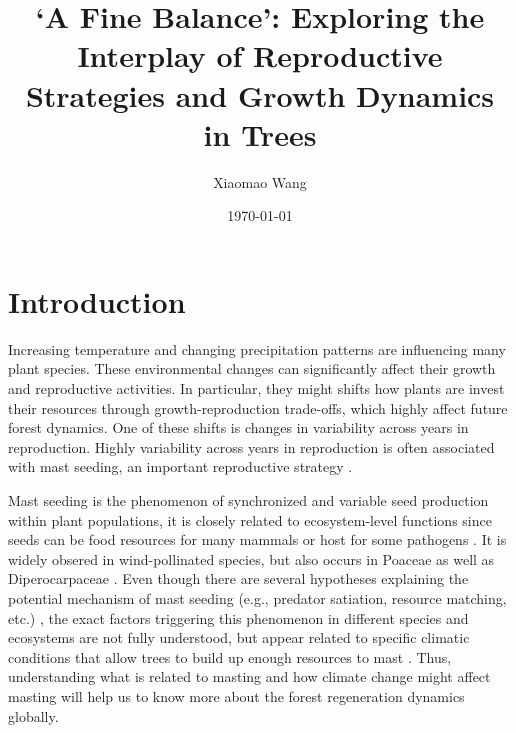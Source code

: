 \documentclass[11pt,letter]{article}
\begin{document}
\title{`A Fine Balance': Exploring the Interplay of Reproductive Strategies and Growth Dynamics in Trees} %
\author{Xiaomao Wang} 
\date{\today}
\maketitle

\setlength{\parindent}{0pt}
\setlength{\parskip}{3pt}

\section{Introduction} %
Increasing temperature and changing precipitation patterns are influencing many plant species. These environmental changes can significantly affect their growth and reproductive activities. In particular, they might shifts how plants are invest their resources through growth-reproduction trade-offs, which highly affect future forest dynamics. One of these shifts is changes in variability across years in reproduction. Highly variability across years in reproduction is often associated with mast seeding, an important reproductive strategy \citep{pearse2016mechanisms}.\par
Mast seeding is the phenomenon of synchronized and variable seed production within plant populations, it is closely related to ecosystem-level functions since seeds can be food resources for many mammals or host for some pathogens  \citep{janzen1971seed, kelly1994evolutionary, davies2024seed}. It is widely obsered in wind-pollinated species, but also occurs in Poaceae as well as Diperocarpaceae  \citep{kelly2002mast}. Even though there are several hypotheses explaining the potential mechanism of mast seeding (e.g., predator satiation, resource matching, etc.)  \citep{koenig2021brief}, the exact factors triggering this phenomenon in different species and ecosystems are not fully understood, but appear related to specific climatic conditions that allow trees to build up enough resources to mast  \citep{pearse2016mechanisms}. Thus, understanding what is related to masting and how climate change might affect masting will help us to know more about the forest regeneration dynamics globally. 
\end{document}
